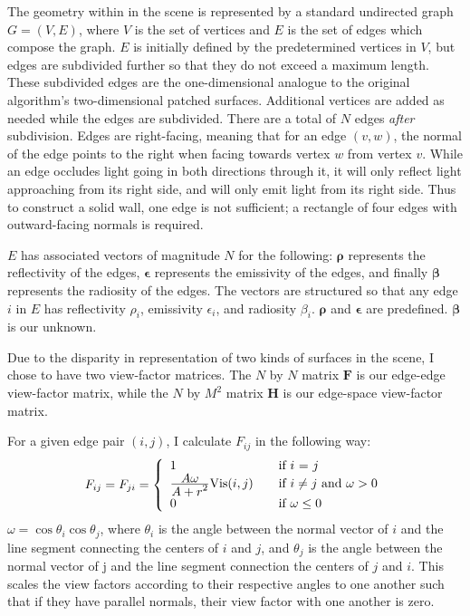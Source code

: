 \documentclass[letter]{article}
\newcommand{\vect}[1]{\boldsymbol{#1}}
\begin{document}
The geometry within in the scene is represented by a standard undirected graph $G = (V, E)$, where $V$ is the set of vertices and $E$ is the set of edges which compose the graph. $E$ is initially defined by the predetermined vertices in $V$, but edges are subdivided further so that they do not exceed a maximum length. These subdivided edges are the one-dimensional analogue to the original algorithm's two-dimensional patched surfaces. Additional vertices are added as needed while the edges are subdivided. There are a total of $N$ edges \emph{after} subdivision. Edges are right-facing, meaning that for an edge $(v, w)$, the normal of the edge points to the right when facing towards vertex $w$ from vertex $v$. While an edge occludes light going in both directions through it, it will only reflect light approaching from its right side, and will only emit light from its right side. Thus to construct a solid wall, one edge is not sufficient; a rectangle of four edges with outward-facing normals is required.

$E$ has associated vectors of magnitude $N$ for the following: $\vect{\rho}$ represents the reflectivity of the edges, $\vect{\epsilon}$ represents the emissivity of the edges, and finally $\vect{\beta}$ represents the radiosity of the edges. The vectors are structured so that any edge $i$ in $E$ has reflectivity $\rho_i$, emissivity $\epsilon_i$, and radiosity $\beta_i$. $\vect{\rho}$ and $\vect{\epsilon}$ are predefined. $\vect{\beta}$ is our unknown.

Due to the disparity in representation of two kinds of surfaces in the scene, I chose to have two view-factor matrices. The $N$ by $N$ matrix $\vect{F}$ is our edge-edge view-factor matrix, while the $N$ by $M^2$ matrix $\vect{H}$ is our edge-space view-factor matrix.

For a given edge pair $(i, j)$, I calculate $F_{ij}$ in the following way:
\begin{equation}
F_{ij} = F_{ji} = \left\{ 
\begin{array}{l l}
  1 & \quad \mbox{if $i$ = $j$}\\
  \frac{\displaystyle A \omega}{\displaystyle A + r^2} \mbox{Vis}(i, j) & \quad \mbox{if $i \neq j$ and $\omega > 0$}\\
  0 & \quad \mbox{if $\omega \leq 0$}\\
\end{array} 
\right.
\end{equation}
$\omega = \cos \theta_i \cos \theta_j$, where $\theta_i$ is the angle between the normal vector of $i$ and the line segment connecting the centers of $i$ and $j$, and $\theta_j$ is the angle between the normal vector of j and the line segment connection the centers of $j$ and $i$. This scales the view factors according to their respective angles to one another such that if they have parallel normals, their view factor with one another is zero.
\end{document}
